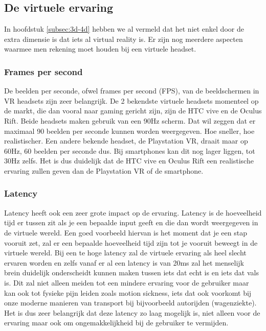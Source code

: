 \subsection{De virtuele ervaring}
\label{subsec:vr-ervaring}
In hoofdstuk \ref{subsec:3d-4d} hebben we al vermeld dat het niet enkel door de extra dimensie is dat iets al virtual reality is. Er zijn nog meerdere aspecten waarmee men rekening moet houden bij een virtuele headset.

\subsubsection{Frames per second}
\label{ssubsec:fps}
De beelden per seconde, ofwel frames per second (FPS), van de beeldschermen in VR headsets zijn zeer belangrijk. De 2 bekendste virtuele headsets momenteel op de markt, die dan vooral naar gaming gericht zijn, zijn de HTC vive en de Oculus Rift. Beide headsets maken gebruik van een 90Hz scherm. Dat wil zeggen dat er maximaal 90 beelden per seconde kunnen worden weergegeven. Hoe sneller, hoe realistischer. Een andere bekende headset, de Playstation VR, draait maar op 60Hz, 60 beelden per seconde dus. Bij smartphones kan dit nog lager liggen, tot 30Hz zelfs. Het is dus duidelijk dat de HTC vive en Oculus Rift een realistische ervaring zullen geven dan de Playstation VR of de smartphone.

\subsubsection{Latency}
\label{ssubsec:fps}
Latency heeft ook een zeer grote impact op de ervaring. Latency is de hoeveelheid tijd er tussen zit als je een bepaalde input geeft en die dan wordt weergegeven in de virtuele wereld. Een goed voorbeeld hiervan is het moment dat je een stap vooruit zet, zal er een bepaalde hoeveelheid tijd zijn tot je vooruit beweegt in de virtuele wereld. Bij een te hoge latency zal de virtuele ervaring als heel slecht ervaren worden en zelfs vanaf er al een latency is van 20ms zal het menselijk brein duidelijk onderscheidt kunnen maken tussen iets dat echt is en iets dat vals is. Dit zal niet alleen meiden tot een mindere ervaring voor de gebruiker maar kan ook tot fysieke pijn leiden zoals motion sickness, iets dat ook voorkomt bij onze moderne manieren van transport bij bijvoorbeeld autorijden (wagenziekte). Het is dus zeer belangrijk dat deze latency zo laag mogelijk is, niet alleen voor de ervaring maar ook om ongemakkelijkheid bij de gebruiker te vermijden.

